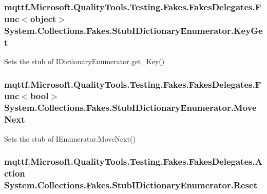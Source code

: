 \hypertarget{class_system_1_1_collections_1_1_fakes_1_1_stub_i_dictionary_enumerator_aac8001a328fea85ddb96bd918ec35941}{
\subsubsection[{Key\-Get}]{\setlength{\rightskip}{0pt plus 5cm}mqttf.\-Microsoft.\-Quality\-Tools.\-Testing.\-Fakes.\-Fakes\-Delegates.\-Func$<$object$>$ System.\-Collections.\-Fakes.\-Stub\-I\-Dictionary\-Enumerator.\-Key\-Get}}\label{class_system_1_1_collections_1_1_fakes_1_1_stub_i_dictionary_enumerator_aac8001a328fea85ddb96bd918ec35941}


Sets the stub of I\-Dictionary\-Enumerator.\-get\-\_\-\-Key()

\hypertarget{class_system_1_1_collections_1_1_fakes_1_1_stub_i_dictionary_enumerator_a2e58c600e7334eea7414402b95b6230d}{
\subsubsection[{Move\-Next}]{\setlength{\rightskip}{0pt plus 5cm}mqttf.\-Microsoft.\-Quality\-Tools.\-Testing.\-Fakes.\-Fakes\-Delegates.\-Func$<$bool$>$ System.\-Collections.\-Fakes.\-Stub\-I\-Dictionary\-Enumerator.\-Move\-Next}}\label{class_system_1_1_collections_1_1_fakes_1_1_stub_i_dictionary_enumerator_a2e58c600e7334eea7414402b95b6230d}


Sets the stub of I\-Enumerator.\-Move\-Next()

\hypertarget{class_system_1_1_collections_1_1_fakes_1_1_stub_i_dictionary_enumerator_af55e9af60090567f60e26fbaf990212b}{
\subsubsection[{Reset}]{\setlength{\rightskip}{0pt plus 5cm}mqttf.\-Microsoft.\-Quality\-Tools.\-Testing.\-Fakes.\-Fakes\-Delegates.\-Action System.\-Collections.\-Fakes.\-Stub\-I\-Dictionary\-Enumerator.\-Reset}}\label{class_system_1_1_collections_1_1_fakes_1_1_stub_i_dictionary_enumerator_af55e9af60090567f60e26fbaf990212b}


